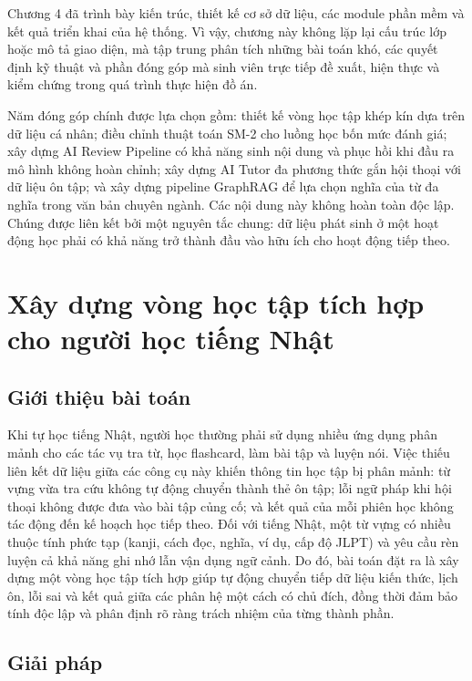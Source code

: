 \documentclass[../DoAn.tex]{subfiles}
\begin{document}
Chương 4 đã trình bày kiến trúc, thiết kế cơ sở dữ liệu, các module phần mềm và kết quả triển khai của hệ thống. Vì vậy, chương này không lặp lại cấu trúc lớp hoặc mô tả giao diện, mà tập trung phân tích những bài toán khó, các quyết định kỹ thuật và phần đóng góp mà sinh viên trực tiếp đề xuất, hiện thực và kiểm chứng trong quá trình thực hiện đồ án.

Năm đóng góp chính được lựa chọn gồm: thiết kế vòng học tập khép kín dựa trên dữ liệu cá nhân; điều chỉnh thuật toán SM-2 cho luồng học bốn mức đánh giá; xây dựng AI Review Pipeline có khả năng sinh nội dung và phục hồi khi đầu ra mô hình không hoàn chỉnh; xây dựng AI Tutor đa phương thức gắn hội thoại với dữ liệu ôn tập; và xây dựng pipeline GraphRAG để lựa chọn nghĩa của từ đa nghĩa trong văn bản chuyên ngành. Các nội dung này không hoàn toàn độc lập. Chúng được liên kết bởi một nguyên tắc chung: dữ liệu phát sinh ở một hoạt động học phải có khả năng trở thành đầu vào hữu ích cho hoạt động tiếp theo.

\section{Xây dựng vòng học tập tích hợp cho người học tiếng Nhật}
\label{section:5.1}

\subsection{Giới thiệu bài toán}
\label{subsection:5.1.1}

Khi tự học tiếng Nhật, người học thường phải sử dụng nhiều ứng dụng phân mảnh cho các tác vụ tra từ, học flashcard, làm bài tập và luyện nói. Việc thiếu liên kết dữ liệu giữa các công cụ này khiến thông tin học tập bị phân mảnh: từ vựng vừa tra cứu không tự động chuyển thành thẻ ôn tập; lỗi ngữ pháp khi hội thoại không được đưa vào bài tập củng cố; và kết quả của mỗi phiên học không tác động đến kế hoạch học tiếp theo. Đối với tiếng Nhật, một từ vựng có nhiều thuộc tính phức tạp (kanji, cách đọc, nghĩa, ví dụ, cấp độ JLPT) và yêu cầu rèn luyện cả khả năng ghi nhớ lẫn vận dụng ngữ cảnh. Do đó, bài toán đặt ra là xây dựng một vòng học tập tích hợp giúp tự động chuyển tiếp dữ liệu kiến thức, lịch ôn, lỗi sai và kết quả giữa các phân hệ một cách có chủ đích, đồng thời đảm bảo tính độc lập và phân định rõ ràng trách nhiệm của từng thành phần.

\subsection{Giải pháp}
\label{subsection:5.1.2}
\end{document}
